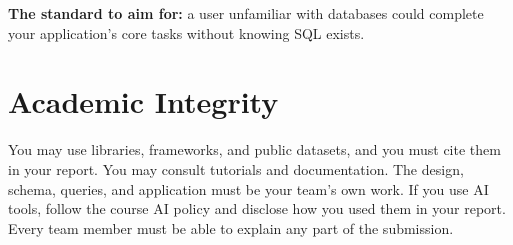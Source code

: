 \documentclass[11pt]{article}
\begin{document}
\vspace{6pt}
\noindent\textbf{The standard to aim for:} a user unfamiliar with databases could complete your application's core tasks without knowing SQL exists.

\section*{Academic Integrity}

You may use libraries, frameworks, and public datasets, and you must cite them in your report. You may consult tutorials and documentation. The design, schema, queries, and application must be your team's own work. 
If you use AI tools, follow the course AI policy and disclose how you used them in your report. Every team member must be able to explain any part of the submission.
\end{document}
